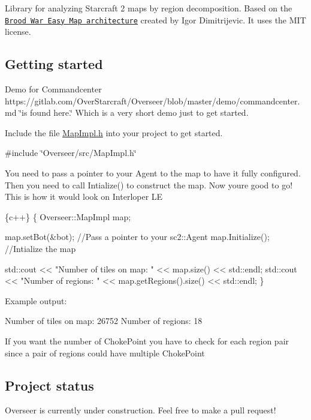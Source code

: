 

Library for analyzing Starcraft 2 maps by region decomposition. Based on the \href{http://bwem.sourceforge.net/}{\tt Brood War Easy Map architecture} created by Igor Dimitrijevic. It uses the M\+IT license.

\subsection*{Getting started}

Demo for Commandcenter https\+://gitlab.com/\+Over\+Starcraft/\+Overseer/blob/master/demo/commandcenter.\+md \char`\"{}is found here.\char`\"{} Which is a very short demo just to get started.

Include the file {\ttfamily \hyperlink{MapImpl_8h_source}{Map\+Impl.\+h}} into your project to get started.

{\ttfamily \#include \char`\"{}\+Overseer/src/\+Map\+Impl.\+h\char`\"{}}

You need to pass a pointer to your Agent to the map to have it fully configured. Then you need to call {\ttfamily Intialize()} to construct the map. Now you\textquotesingle{}re good to go! This is how it would look on Interloper LE


\begin{DoxyCode}
\{c++\}
\{
    Overseer::MapImpl map;

    map.setBot(&bot); //Pass a pointer to your sc2::Agent
    map.Initialize(); //Intialize the map

    std::cout << "Number of tiles on map: " << map.size() << std::endl;
    std::cout << "Number of regions: " << map.getRegions().size() << std::endl;
\}
\end{DoxyCode}


Example output\+:


\begin{DoxyCode}
Number of tiles on map: 26752
Number of regions: 18
\end{DoxyCode}


If you want the number of {\ttfamily Choke\+Point} you have to check for each region pair since a pair of regions could have multiple {\ttfamily Choke\+Point}

\subsection*{Project status}

Overseer is currently under construction. Feel free to make a pull request!

